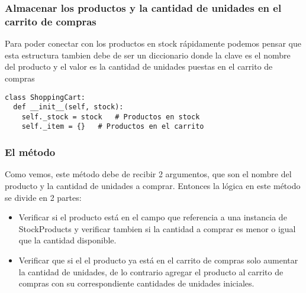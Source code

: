 \subsubsection{Almacenar los productos y la cantidad de unidades en el carrito de compras}
Para poder conectar con los productos en stock rápidamente podemos pensar que esta estructura tambien debe de ser un diccionario donde la clave es el nombre del producto y el valor es la cantidad de unidades puestas en el carrito de compras

\begin{verbatim}
class ShoppingCart:
  def __init__(self, stock):
    self._stock = stock   # Productos en stock
    self._item = {}   # Productos en el carrito
\end{verbatim}

\subsubsection{El método }
Como vemos, este método debe de recibir 2 argumentos, que son el nombre del producto y la cantidad de unidades a comprar. Entonces la lógica en este método se divide en 2 partes:

\begin{itemize}
  \item Verificar si el producto está en el campo que referencia a una instancia de StockProducts y verificar tambien si la cantidad a comprar es menor o igual que la cantidad disponible.
  \item Verificar que si el el producto ya está en el carrito de compras solo aumentar la cantidad de unidades, de lo contrario agregar el producto al carrito de compras con su correspondiente cantidades de unidades iniciales.
\end{itemize}

